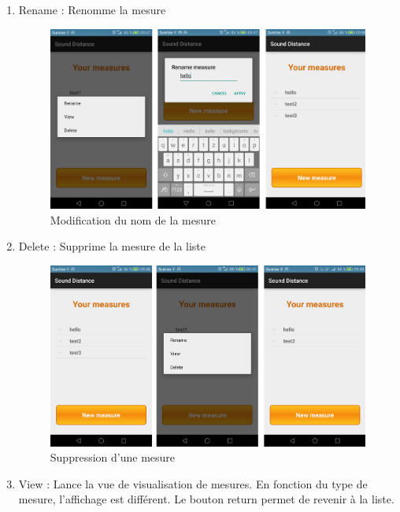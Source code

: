 \begin{enumerate}
	\item Rename : Renomme la mesure
	\begin{figure}[H]
		\begin{center}
			\includegraphics[width=16cm]{img/renameMeas.png}
			\caption{Modification du nom de la mesure}
			\label{rename}
		\end{center}
	\end{figure}
	\item Delete : Supprime la mesure de la liste
	\begin{figure}[H]
		\begin{center}
			\includegraphics[width=16cm]{img/deleteMeas.png}
			\caption{Suppression d'une mesure}
			\label{delete}
		\end{center}
	\end{figure}
	\item View : Lance la vue de visualisation de mesures. En fonction du type de mesure, l'affichage est différent. Le bouton return permet de revenir à la liste.
	\begin{figure}[H]

\end{figure}
\end{enumerate}
